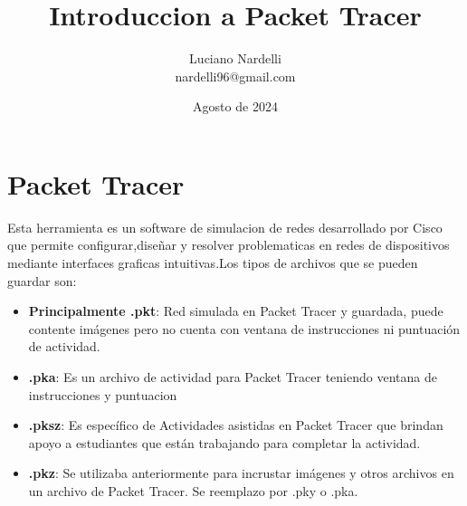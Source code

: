 \documentclass{article}
\title{Introduccion a Packet Tracer}
\author{Luciano Nardelli  \\ {nardelli96@gmail.com}}
\date{Agosto de 2024}
\begin{document}
    \maketitle

    \section{Packet Tracer}
        
        Esta herramienta es un software de simulacion de redes desarrollado por Cisco que permite configurar,diseñar y resolver problematicas en redes de dispositivos mediante interfaces graficas intuitivas.Los tipos de archivos que se pueden guardar son:
        \begin{itemize}
        \item \textbf{Principalmente .pkt}: Red simulada en Packet Tracer y guardada, puede contente imágenes pero no cuenta con ventana de instrucciones ni puntuación de actividad.
        \item \textbf{.pka}: Es un archivo de actividad para Packet Tracer teniendo ventana de instrucciones y puntuacion
        \item \textbf{.pksz}: Es específico de Actividades asistidas en Packet Tracer que brindan apoyo a estudiantes que están trabajando para completar la actividad.
        \item \textbf{.pkz}: Se utilizaba anteriormente para incrustar imágenes y otros archivos en un archivo de Packet Tracer. Se reemplazo por .pky o .pka.
        \end{itemize}
    
\end{document}
